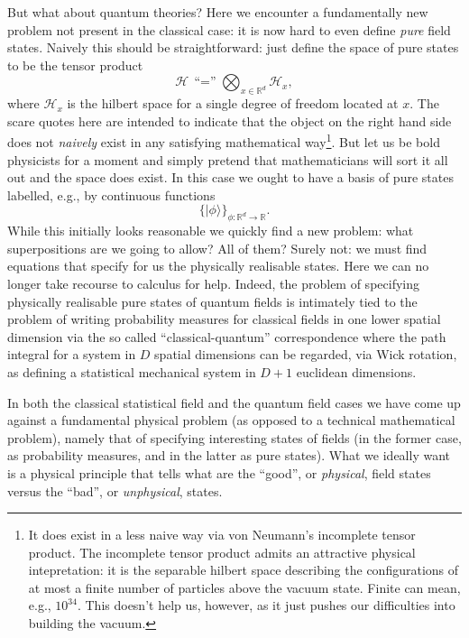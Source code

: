 \documentclass[11pt]{amsart}
\theoremstyle{plain}%
\theoremstyle{definition}
\theoremstyle{remark}
\begin{document}
But what about quantum theories? Here we encounter a fundamentally new problem not present in the classical case: it is now hard to even define \emph{pure} field states. Naively this should be straightforward: just define the space of pure states to be the tensor product
\begin{equation}
	\mathcal{H}\, \text{``$=$''} \bigotimes_{x\in \mathbb{R}^d} \mathcal{H}_x,
\end{equation}
where $\mathcal{H}_x$ is the hilbert space for a single degree of freedom located at $x$. The scare quotes here are intended to indicate that the object on the right hand side does not \emph{naively} exist in any satisfying mathematical way\footnote{It does exist in a less naive way via von Neumann's incomplete tensor product. The incomplete tensor product admits an attractive physical intepretation: it is the separable hilbert space describing the configurations of at most a finite number of particles above the vacuum state. Finite can mean, e.g., $10^{34}$. This doesn't help us, however, as it just pushes our difficulties into building the vacuum.}. But let us be bold physicists for a moment and simply pretend that mathematicians will sort it all out and the space does exist. In this case we ought to have a basis of pure states labelled, e.g., by continuous functions
\begin{equation}
	\{|\phi\rangle \}_{\phi:\mathbb{R}^d\rightarrow \mathbb{R}}.
\end{equation}
While this initially looks reasonable we quickly find a new problem: what superpositions are we going to allow? All of them? Surely not: we must find equations that specify for us the physically realisable states. Here we can no longer take recourse to calculus for help. Indeed, the problem of specifying physically realisable pure states of quantum fields is intimately tied to the problem of writing probability measures for classical fields in one lower spatial dimension via the so called ``classical-quantum'' correspondence where the path integral for a system in $D$ spatial dimensions can be regarded, via Wick rotation, as defining a statistical mechanical system in $D+1$ euclidean dimensions.

In both the classical statistical field and the quantum field cases we have come up against a fundamental physical problem (as opposed to a technical mathematical problem), namely that of specifying interesting states of fields (in the former case, as probability measures, and in the latter as pure states). What we ideally want is a physical principle that tells what are the ``good'', or \emph{physical}, field states versus the ``bad'', or \emph{unphysical}, states.  
\end{document}
